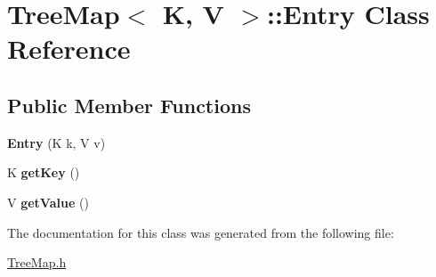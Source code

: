 \hypertarget{class_tree_map_1_1_entry}{\section{Tree\-Map$<$ K, V $>$\-:\-:Entry Class Reference}
\label{class_tree_map_1_1_entry}
}
\subsection*{Public Member Functions}
\begin{DoxyCompactItemize}
\item 
\hypertarget{class_tree_map_1_1_entry_a723af64b1d16950c6e1a56e44bf515f6}{{\bfseries Entry} (K k, V v)}\label{class_tree_map_1_1_entry_a723af64b1d16950c6e1a56e44bf515f6}

\item 
\hypertarget{class_tree_map_1_1_entry_a544761de0835bade8787adee6b107069}{K {\bfseries get\-Key} ()}\label{class_tree_map_1_1_entry_a544761de0835bade8787adee6b107069}

\item 
\hypertarget{class_tree_map_1_1_entry_ad60d6732cc72bf415e592f9fe85c38cb}{V {\bfseries get\-Value} ()}\label{class_tree_map_1_1_entry_ad60d6732cc72bf415e592f9fe85c38cb}

\end{DoxyCompactItemize}


The documentation for this class was generated from the following file\-:\begin{DoxyCompactItemize}
\item 
\hyperlink{_tree_map_8h}{Tree\-Map.\-h}\end{DoxyCompactItemize}
